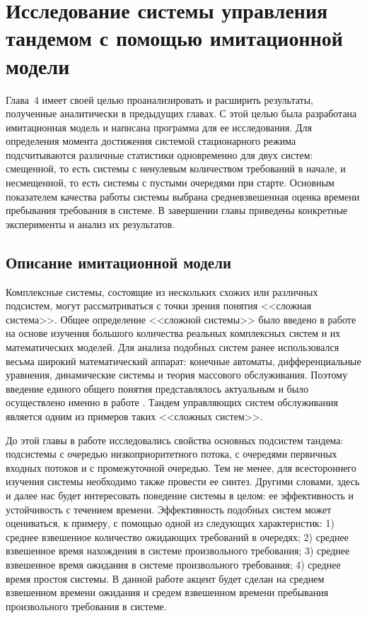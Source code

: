 \chapter{Исследование системы управления тандемом с помощью имитационной модели}						%

Глава~4 имеет своей целью проанализировать и расширить результаты, полученные аналитически в предыдущих главах. С этой целью была разработана имитационная модель и написана программа для ее исследования. Для определения момента достижения системой стационарного режима подсчитываются различные статистики одновременно для двух систем: смещенной, то есть системы с ненулевым количеством требований в начале, и несмещенной, то есть системы с пустыми очередями при старте. Основным показателем качества работы системы выбрана средневзвешенная оценка времени пребывания требования в системе. В завершении главы приведены конкретные эксперименты и анализ их результатов.

\section{Описание имитационной модели}
Комплексные системы, состоящие из нескольких схожих или различных подсистем, могут рассматриваться с точки зрения понятия <<сложная система>>. Общее определение <<сложной системы>> было введено в работе \cite{Buslenko:1978} на основе изучения большого количества реальных комплексных систем и их математических моделей. Для анализа подобных систем ранее использовался весьма широкий математический аппарат: конечные автоматы, дифференциальные уравнения, динамические системы и теория массового обслуживания. Поэтому введение единого общего понятия представлялось актуальным и было осуществлено именно в работе \cite{Buslenko:1978}. Тандем управляющих систем обслуживания является одним из примеров таких <<сложных систем>>. 

До этой главы в работе исследовались свойства основных подсистем тандема: подсистемы с очередью низкоприоритетного потока, с очередями первичных входных потоков и с промежуточной очередью. Тем не менее, для всестороннего изучения системы необходимо также провести ее синтез. Другими словами, здесь и далее нас будет интересовать поведение системы в целом: ее эффективность и устойчивость с течением времени. Эффективность подобных систем может оцениваться, к примеру, с помощью одной из следующих характеристик: 1) среднее взвешенное количество ожидающих требований в очередях; 2) среднее взвешенное время нахождения в системе произвольного требования; 3) среднее взвешенное время ожидания в системе произвольного требования; 4) среднее время простоя системы. В данной работе акцент будет сделан на среднем взвешенном времени ожидания и средем взвешенном времени пребывания произвольного требования в системе.

